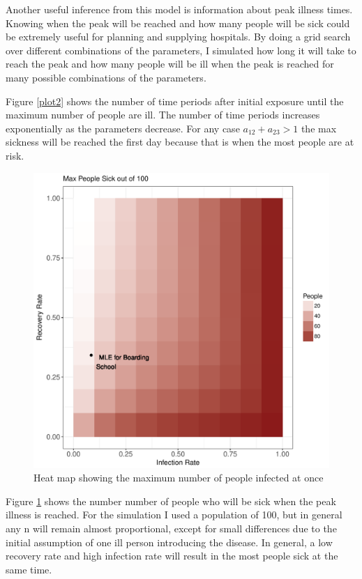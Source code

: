 \documentclass{svproc}
\begin{document}
Another useful inference from this model is information about peak illness times. Knowing when the peak will be reached and how many people will be sick could be extremely useful for planning and supplying hospitals. By doing a grid search over different combinations of the parameters, I simulated how long it will take to reach the peak and how many people will be ill when the peak is reached for many possible combinations of the parameters. 


Figure \ref{plot2} shows the number of time periods after initial exposure until the maximum number of people are ill. The number of time periods increases exponentially as the parameters decrease. For any case $a_{12}+a_{23}>1$ the max sickness will be reached the first day because that is when the most people are at risk. 

\begin{figure}
\centering
\includegraphics[scale=.7]{MaxGrid.pdf}
\caption{Heat map showing the maximum number of people infected at once}
\label{plot3}
\end{figure}

Figure \ref{plot3} shows the number number of people who will be sick when the peak illness is reached. For the simulation I used a population of 100, but in general any n will remain almost proportional, except for small differences due to the initial assumption of one ill person introducing the disease. In general, a low recovery rate and high infection rate will result in the most people sick at the same time.
\end{document}

